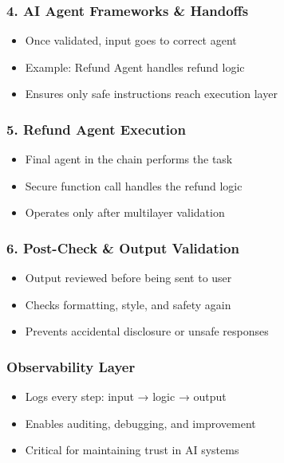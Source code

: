 \begin{frame}[fragile]\frametitle{4. AI Agent Frameworks \& Handoffs}
    \begin{itemize}
        \item Once validated, input goes to correct agent
        \item Example: Refund Agent handles refund logic
        \item Ensures only safe instructions reach execution layer
    \end{itemize}
\end{frame}

\begin{frame}[fragile]\frametitle{5. Refund Agent Execution}
    \begin{itemize}
        \item Final agent in the chain performs the task
        \item Secure function call handles the refund logic
        \item Operates only after multilayer validation
    \end{itemize}
\end{frame}

\begin{frame}[fragile]\frametitle{6. Post-Check \& Output Validation}
    \begin{itemize}
        \item Output reviewed before being sent to user
        \item Checks formatting, style, and safety again
        \item Prevents accidental disclosure or unsafe responses
    \end{itemize}
\end{frame}

\begin{frame}[fragile]\frametitle{Observability Layer}
    \begin{itemize}
        \item Logs every step: input → logic → output
        \item Enables auditing, debugging, and improvement
        \item Critical for maintaining trust in AI systems
    \end{itemize}
\end{frame}

